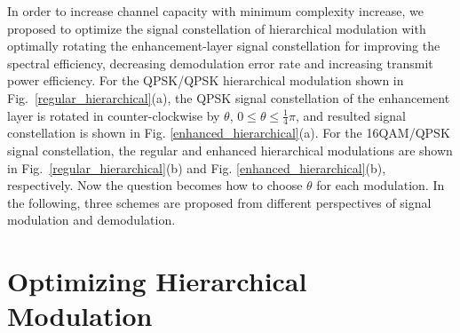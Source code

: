 \documentclass[conference]{IEEEtran}
\begin{document}
In order to increase channel capacity with minimum complexity
increase, we proposed to optimize the signal constellation of
hierarchical modulation with optimally rotating the
enhancement-layer signal constellation for improving the spectral
efficiency, decreasing demodulation error rate and increasing
transmit power efficiency. For the QPSK/QPSK hierarchical
modulation shown in Fig.~\ref{regular_hierarchical}(a), the QPSK
signal constellation of the enhancement layer is rotated in
counter-clockwise by $\theta$, $0\leq\theta\leq\frac{1}{4}\pi$,
and resulted signal constellation is shown in Fig.
\ref{enhanced_hierarchical}(a). For the 16QAM/QPSK signal
constellation, the regular and enhanced hierarchical modulations
are shown in Fig.~\ref{regular_hierarchical}(b) and Fig.
\ref{enhanced_hierarchical}(b), respectively. Now the question
becomes how to choose $\theta$ for each modulation. In the
following, three schemes are proposed from different perspectives
of signal modulation and demodulation.
\begin{figure}
\end{figure}

\section{Optimizing Hierarchical Modulation}
\end{document}
